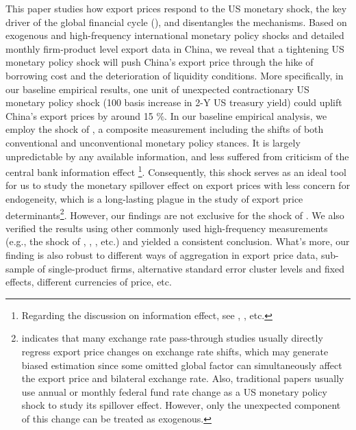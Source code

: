 This paper studies how export prices respond to the US monetary shock, the key driver of the global financial cycle (\cite{miranda2020us}), and disentangles the mechanisms. Based on exogenous and high-frequency international monetary policy shocks and detailed monthly firm-product level export data in China, we reveal that a tightening US monetary policy shock will push China's export price through the hike of borrowing cost and the deterioration of liquidity conditions. More specifically, in our baseline empirical results, one unit of unexpected contractionary US monetary policy shock (100 basis increase in 2-Y US treasury yield) could uplift China's export prices by around 15 $\%$. In our baseline empirical analysis, we employ the shock of \cite{bu2021unified}, a composite measurement including the shifts of both conventional and unconventional monetary policy stances. It is largely unpredictable by any available information, and less suffered from criticism of the central bank information effect \footnote{Regarding the discussion on information effect, see \cite{nakamura2018high}, \cite{jarocinski2020deconstructing}, etc.}. Consequently, this shock serves as an ideal tool for us to study the monetary spillover effect on export prices with less concern for endogeneity, which is a long-lasting plague in the study of export price determinants\footnote{\cite{zhang2022monetary} indicates that many exchange rate pass-through studies usually directly regress export price changes on exchange rate shifts, which may generate biased estimation since some omitted global factor can simultaneously affect the export price and bilateral exchange rate. Also, traditional papers usually use annual or monthly federal fund rate change as a US monetary policy shock to study its spillover effect. However, only the unexpected component of this change can be treated as exogenous.}. However, our findings are not exclusive for the shock of \cite{bu2021unified}. We also verified the results using other commonly used high-frequency measurements (e.g., the shock of \cite{guraynak2005actions}, \cite{nakamura2018high}, \cite{jarocinski2020deconstructing}, etc.) and yielded a consistent conclusion. What's more, our finding is also robust to different ways of aggregation in export price data, sub-sample of single-product firms, alternative standard error cluster levels and fixed effects, different currencies of price, etc. 

